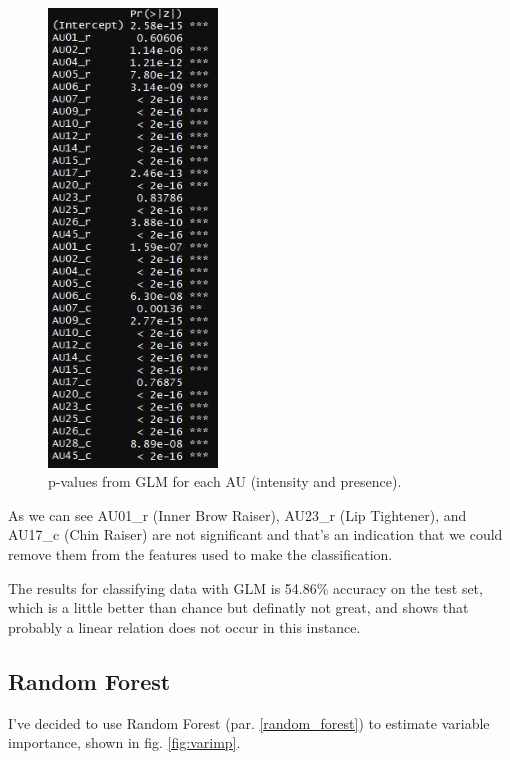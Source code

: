 \begin{figure}[H]
	\centering
	\includegraphics[width=0.4\textwidth]{images/pval}
	\caption{p-values from GLM for each AU (intensity and presence).}
	\label{fig:pval}
\end{figure}

As we can see AU01\_r (Inner Brow Raiser), AU23\_r (Lip Tightener), and AU17\_c (Chin Raiser) are not significant and that's an indication that we could remove them from the features used to make the classification.

The results for classifying data with GLM is 54.86\% accuracy on the test set, which is a little better than chance but definatly not great, and shows that probably a linear relation does not occur in this instance. 

\clearpage

\subsection{Random Forest} \label{rf}
I've decided to use Random Forest (par. \ref{random_forest}) to estimate variable importance, shown in fig. \ref{fig:varimp}.

